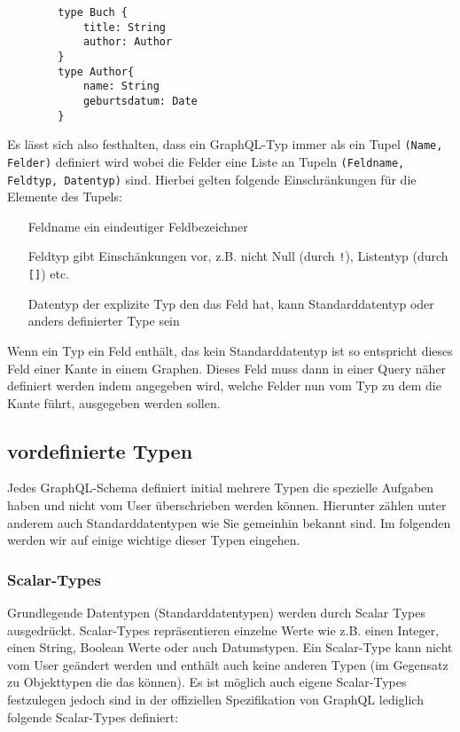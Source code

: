 \begin{center}
    \begin{verbatim}
        type Buch {
            title: String
            author: Author
        }
        type Author{
            name: String
            geburtsdatum: Date
        }
    \end{verbatim}
\end{center}

Es lässt sich also festhalten, dass ein GraphQL-Typ immer als ein Tupel \verb+(Name, Felder)+ definiert wird wobei
die Felder eine Liste an Tupeln \verb+(Feldname, Feldtyp, Datentyp)+ sind.
Hierbei gelten folgende Einschränkungen für die Elemente des Tupels:

\begin{center}
    \begin{itemize}
        \item[Feldname] ein eindeutiger Feldbezeichner
        \item[Feldtyp] gibt Einschänkungen vor, z.B. nicht Null (durch \verb+!+), Listentyp (durch \verb+[]+) etc.
        \item[Datentyp] der explizite Typ den das Feld hat, kann Standarddatentyp oder anders definierter Type sein
    \end{itemize}
\end{center}

Wenn ein Typ ein Feld enthält, das kein Standarddatentyp ist so entspricht dieses Feld einer Kante in einem Graphen.
Dieses Feld muss dann in einer Query näher definiert werden indem angegeben wird, welche Felder nun vom Typ zu dem die
Kante führt, ausgegeben werden sollen.

\subsection{vordefinierte Typen}

Jedes GraphQL-Schema definiert initial mehrere Typen die spezielle Aufgaben haben und nicht vom User überschrieben werden können.
Hierunter zählen unter anderem auch Standarddatentypen wie Sie gemeinhin bekannt sind.
Im folgenden werden wir auf einige wichtige dieser Typen eingehen.

\subsubsection{Scalar-Types}

Grundlegende Datentypen (Standarddatentypen) werden durch Scalar Types ausgedrückt. Scalar-Types repräsentieren einzelne Werte
wie z.B. einen Integer, einen String, Boolean Werte oder auch Datumstypen.
Ein Scalar-Type kann nicht vom User geändert werden und enthält auch keine anderen Typen (im Gegensatz zu Objekttypen die das können).
Es ist möglich auch eigene Scalar-Types festzulegen jedoch sind in der offiziellen Spezifikation von GraphQL
lediglich folgende Scalar-Types definiert:


